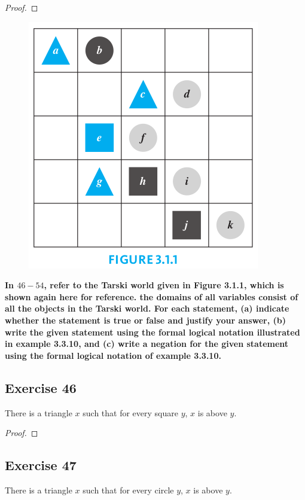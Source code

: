 \documentclass[14pt]{extarticle}
\begin{document}
\begin{proof}

\end{proof}

\begin{figure}[ht!]
\centering
\includegraphics[scale=0.4]{../images/3.1.1.png}
\end{figure}

{\bf \color{cyan} In $46-54$, refer to the Tarski world given in Figure 3.1.1, which is shown again here for reference. the domains of all variables consist of all the objects in the Tarski world. For each statement, (a) indicate whether the statement is true or false and justify your answer, (b) write the given statement using the formal logical notation illustrated in example 3.3.10, and (c) write a negation for the given statement using the formal logical notation of example 3.3.10.}

\subsection{Exercise 46}
There is a triangle $x$ such that for every square $y$, $x$ is above $y$.

\begin{proof}

\end{proof}

\subsection{Exercise 47}
There is a triangle $x$ such that for every circle $y$, $x$ is above $y$.
\end{document}
